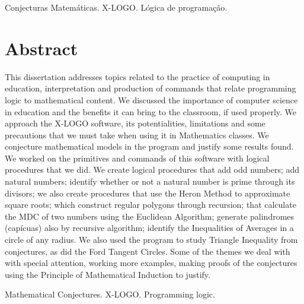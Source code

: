 \documentclass[12pt, a4paper,oneside]{book}
\begin{document}
 Conjecturas Matemáticas. X-LOGO. Lógica de programação.


\newpage
\thispagestyle{empty}
\chapter*{Abstract}

This dissertation addresses topics related to the practice of computing in education, interpretation and production of commands that relate programming logic to mathematical content. We discussed the importance of computer science in education and the benefits it can bring to the classroom, if used properly. We approach the X-LOGO software, its potentialities, limitations and some precautions that we must take when using it in Mathematics classes. We conjecture mathematical models in the program and justify some results found. We worked on the primitives and commands of this software with logical procedures that we did. We create logical procedures that add odd numbers; add natural numbers; identify whether or not a natural number is prime through its divisors; we also create procedures that use the Heron Method to approximate square roots; which construct regular polygons through recursion; that calculate the MDC of two numbers using the Euclidean Algorithm; generate palindromes (capícuas) also by recursive algorithm; identify the Inequalities of Averages in a circle of any radius. We also used the program to study Triangle Inequality from conjectures, as did the Ford Tangent Circles. Some of the themes we deal with with special attention, working more examples, making proofs of the conjectures using the Principle of Mathematical Induction to justify.

 Mathematical Conjectures. X-LOGO. Programming logic.


\newpage
\thispagestyle{empty}
\tableofcontents


\newpage
\listoffigures


\newpage
\listoftables

\mainmatter








\nocite{khan,da2005aplicaccao,gama2004,lior2014,dados1}

\newpage
\renewcommand{\refname}{REFERÊNCIAS BIBLIOGRÁFICAS}


\renewcommand{\refname}{APÊNDICES}
\appendix %



\end{document}
